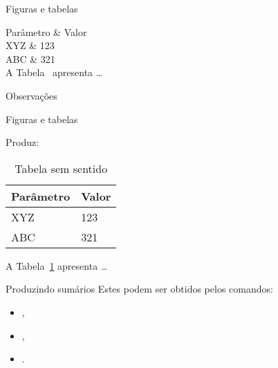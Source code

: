 \begin{frame}{Figuras e tabelas}
\fontsize{10}{11}\selectfont

\begin{LaTeXcode}[Exemplo]
\Lopt[!tp] \n
{} 
 \n
{} \n
{} \string\hline \n
Parâmetro \& Valor \string\\ \string\hline\string\hline \n
XYZ \& 123 \string\\ \n
ABC \& 321 \string\\ \string\hline \n
{} \n
{} \n
A Tabela\string~ apresenta \string\dots
\end{LaTeXcode}

\begin{block}{Observações}
\end{block}
\end{frame}

\begin{frame}{Figuras e tabelas}
\fontsize{10}{11}\selectfont

Produz:

\begin{LaTeXoutput}
\begin{table}
\caption{Tabela sem sentido}%
\label{tab:semsentido}
\centering
\begin{tabular}{l|l} \hline
Parâmetro & Valor \\ \hline\hline
XYZ & 123 \\
ABC & 321 \\ \hline
\end{tabular}
\end{table}
A Tabela~\ref{tab:semsentido} apresenta \ldots
\end{LaTeXoutput}
\end{frame}

\begin{frame}{Produzindo sumários}
Estes podem ser obtidos pelos comandos: 
\begin{itemize}
\item {},
\item {}, 
\item {}.
\end{itemize}
\end{frame}

